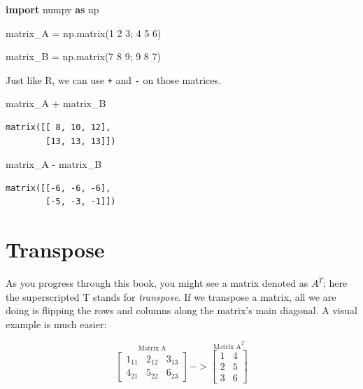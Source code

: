 \documentclass[
  letterpaper,
]{krantz}
\newenvironment{Shaded}{}{}
\newcommand{\ImportTok}[1]{\textcolor[rgb]{0.00,0.50,0.00}{\textbf{#1}}}
\newcommand{\NormalTok}[1]{#1}
\newcommand{\OperatorTok}[1]{\textcolor[rgb]{0.40,0.40,0.40}{#1}}
\newcommand{\StringTok}[1]{\textcolor[rgb]{0.25,0.44,0.63}{#1}}
\begin{document}
\begin{Shaded}
\begin{Highlighting}[]
\ImportTok{import}\NormalTok{ numpy }\ImportTok{as}\NormalTok{ np}

\NormalTok{matrix\_A }\OperatorTok{=}\NormalTok{ np.matrix(}\StringTok{\textquotesingle{}1 2 3; 4 5 6\textquotesingle{}}\NormalTok{)}

\NormalTok{matrix\_B }\OperatorTok{=}\NormalTok{ np.matrix(}\StringTok{\textquotesingle{}7 8 9; 9 8 7\textquotesingle{}}\NormalTok{)}
\end{Highlighting}
\end{Shaded}

Just like R, we can use \texttt{+} and \texttt{-} on those matrices.

\begin{Shaded}
\begin{Highlighting}[]
\NormalTok{matrix\_A }\OperatorTok{+}\NormalTok{ matrix\_B}
\end{Highlighting}
\end{Shaded}

\begin{verbatim}
matrix([[ 8, 10, 12],
        [13, 13, 13]])
\end{verbatim}

\begin{Shaded}
\begin{Highlighting}[]
\NormalTok{matrix\_A }\OperatorTok{{-}}\NormalTok{ matrix\_B}
\end{Highlighting}
\end{Shaded}

\begin{verbatim}
matrix([[-6, -6, -6],
        [-5, -3, -1]])
\end{verbatim}

\section{Transpose}\label{transpose}

As you progress through this book, you might see a matrix denoted as
\(A^T\); here the superscripted T stands for \emph{transpose}. If we
transpose a matrix, all we are doing is flipping the rows and columns
along the matrix's main diagonal. A visual example is much easier:

\[
\stackrel{\mbox{Matrix A}}{
\begin{bmatrix}
1_{11} & 2_{12} & 3_{13}\\
4_{21} & 5_{22} & 6_{23}
\end{bmatrix}
}
->
\stackrel{\mbox{Matrix A}^T}{
\begin{bmatrix}
1 & 4 \\
2 & 5 \\
3 & 6
\end{bmatrix}
}
\]
\end{document}

